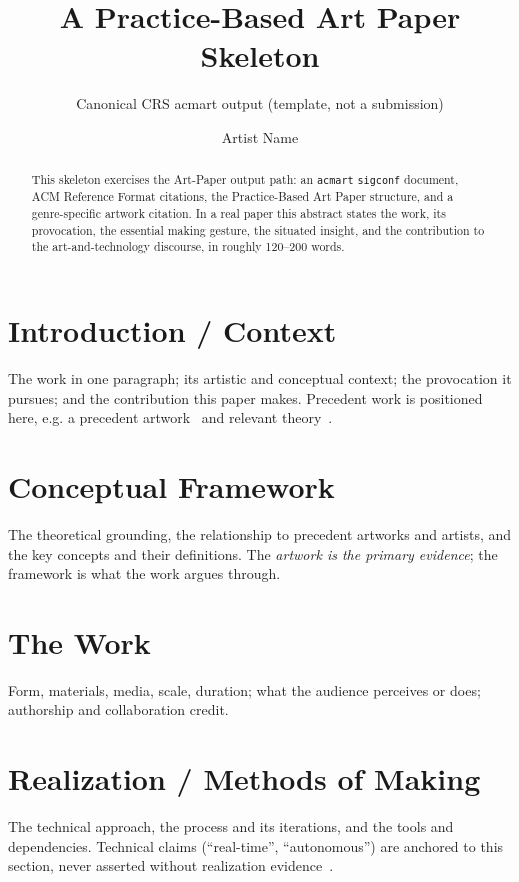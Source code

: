 \documentclass[sigconf,nonacm]{acmart}
\begin{document}
\title{A Practice-Based Art Paper Skeleton}
\subtitle{Canonical CRS acmart output (template, not a submission)}

\author{Artist Name}

\begin{abstract}
This skeleton exercises the Art-Paper output path: an
\texttt{acmart} \texttt{sigconf} document, ACM Reference Format citations, the
Practice-Based Art Paper structure, and a genre-specific artwork citation. In a
real paper this abstract states the work, its provocation, the essential making
gesture, the situated insight, and the contribution to the art-and-technology
discourse, in roughly 120--200 words.
\end{abstract}


\maketitle

\section{Introduction / Context}
The work in one paragraph; its artistic and conceptual context; the provocation
it pursues; and the contribution this paper makes. Precedent work is positioned
here, e.g. a precedent artwork~\cite{precedentArtwork} and relevant
theory~\cite{leonardoArticle}.

\section{Conceptual Framework}
The theoretical grounding, the relationship to precedent artworks and artists,
and the key concepts and their definitions. The \emph{artwork is the primary
evidence}; the framework is what the work argues through.

\section{The Work}
Form, materials, media, scale, duration; what the audience perceives or does;
authorship and collaboration credit.

\section{Realization / Methods of Making}
The technical approach, the process and its iterations, and the tools and
dependencies. Technical claims (``real-time'', ``autonomous'') are anchored to
this section, never asserted without realization evidence~\cite{siggraphWork}.
\end{document}
